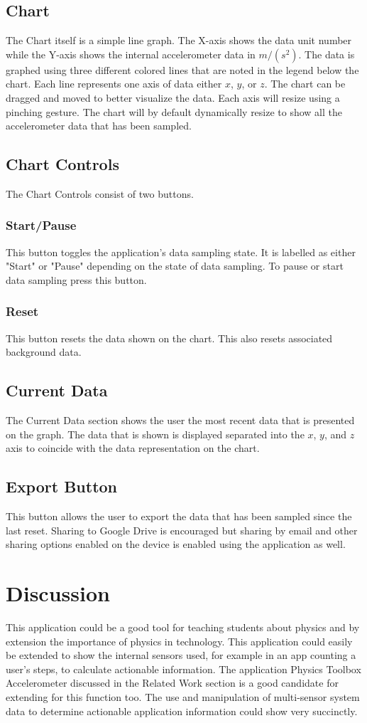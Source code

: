 \documentclass{article}
\begin{document}
\subsection{Chart}
The Chart itself is a simple line graph. The X-axis shows the data unit number while the Y-axis shows the internal  accelerometer data in $m/(s^2)$. The data is graphed using three different colored lines that are noted in the legend below the chart. Each line represents one axis of data either $x$, $y$, or $z$. The chart can be dragged and moved to better visualize the data. Each axis will resize using a pinching gesture. The chart will by default dynamically resize to show all the accelerometer data that has been sampled.
\subsection{Chart Controls}
The Chart Controls consist of two buttons. 
\subsubsection{Start/Pause}
This button toggles the application's data sampling state. It is labelled as either "Start" or "Pause" depending on the state of data sampling. To pause or start data sampling press this button.
\subsubsection{Reset}
This button resets the data shown on the chart. This also resets associated background data.
\subsection{Current Data}
The Current Data section shows the user the most recent data that is presented on the graph. The data that is shown is displayed separated into the $x$, $y$, and $z$ axis to coincide with the data representation on the chart.
\subsection{Export Button}
This button allows the user to export the data that has been sampled since the last reset. Sharing to Google Drive is encouraged but sharing by email and other sharing options enabled on the device is enabled using the application as well.

\section{Discussion}
This application could be a good tool for teaching students about physics and by extension the importance of physics in technology. This application could easily be extended to show the internal sensors used, for example in an app counting a user's steps, to calculate actionable information. The application Physics Toolbox Accelerometer discussed in the Related Work section is a good candidate for extending for this function too. The use and manipulation of multi-sensor system data to determine actionable application information could show very succinctly.
\end{document}
